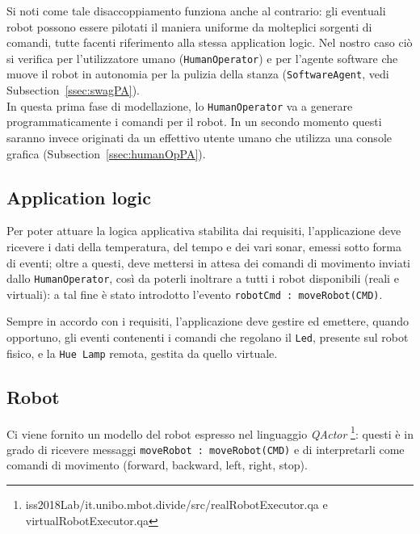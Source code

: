 \documentclass{../llncs}
\newcommand{\codescript}[1]{{\mbox{\small{\texttt{#1}}}}\xspace}
\newcommand{\qa}{\textsf{\textit{QActor}}\xspace}
\newcommand{\labelssec}[1]{\label{ssec:#1}}
\newcommand{\xss}[1]{\subsectionname~\ref{ssec:#1}}
\newcommand{\subsectionname}{Subsection}
\begin{document}
Si noti come tale disaccoppiamento funziona anche al contrario: gli eventuali robot possono essere pilotati il maniera uniforme da molteplici sorgenti di comandi, tutte facenti riferimento alla stessa application logic. Nel nostro caso ciò si verifica per l'utilizzatore umano (\texttt{HumanOperator}) e per l'agente software che muove il robot in autonomia per la pulizia della stanza (\texttt{SoftwareAgent}, vedi \xss{swagPA}).\\



In questa prima fase di modellazione, lo \texttt{HumanOperator} va a generare programmaticamente i comandi per il robot. In un secondo momento questi saranno invece originati da un effettivo utente umano che utilizza una console grafica (\xss{humanOpPA}).

\subsection{Application logic}
Per poter attuare la logica applicativa stabilita dai requisiti, l'applicazione deve ricevere i dati della temperatura, del tempo e dei vari sonar, emessi sotto forma di eventi; oltre a questi, deve mettersi in attesa dei comandi di movimento inviati dallo \texttt{HumanOperator}, così da poterli inoltrare a tutti i robot disponibili (reali e virtuali): a tal fine è stato introdotto l'evento \codescript{robotCmd : moveRobot(CMD)}.

Sempre in accordo con i requisiti, l'applicazione deve gestire ed emettere, quando opportuno, gli eventi contenenti i comandi che regolano il \texttt{Led}, presente sul robot fisico, e la \texttt{Hue Lamp} remota, gestita da quello virtuale.\\



\subsection{Robot}
\labelssec{robotRA}
Ci viene fornito un modello del robot espresso nel linguaggio \qa
\footnote{iss2018Lab/it.unibo.mbot.divide/src/realRobotExecutor.qa e virtualRobotExecutor.qa}: questi è in grado di ricevere messaggi \codescript{moveRobot : moveRobot(CMD)} e di interpretarli come comandi di movimento (forward, backward, left, right, stop).
\end{document}
